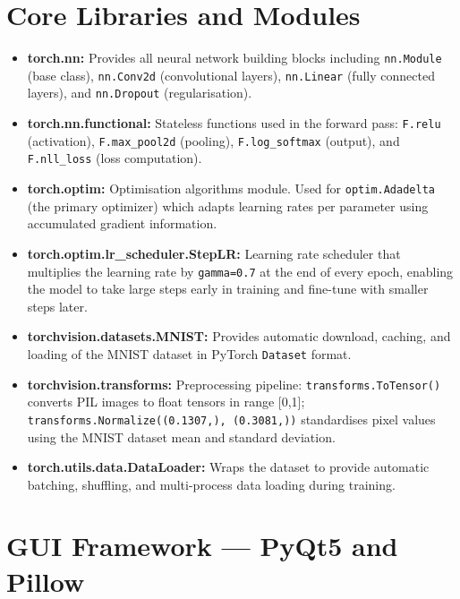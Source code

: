 \documentclass[12pt,a4paper,openany]{report}
\begin{document}
\section{Core Libraries and Modules}

\begin{itemize}
    \item \textbf{torch.nn:} Provides all neural network building blocks including \texttt{nn.Module} (base class), \texttt{nn.Conv2d} (convolutional layers), \texttt{nn.Linear} (fully connected layers), and \texttt{nn.Dropout} (regularisation).
    \item \textbf{torch.nn.functional:} Stateless functions used in the forward pass: \texttt{F.relu} (activation), \texttt{F.max\_pool2d} (pooling), \texttt{F.log\_softmax} (output), and \texttt{F.nll\_loss} (loss computation).
    \item \textbf{torch.optim:} Optimisation algorithms module. Used for \texttt{optim.Adadelta} (the primary optimizer) which adapts learning rates per parameter using accumulated gradient information.
    \item \textbf{torch.optim.lr\_scheduler.StepLR:} Learning rate scheduler that multiplies the learning rate by \texttt{gamma=0.7} at the end of every epoch, enabling the model to take large steps early in training and fine-tune with smaller steps later.
    \item \textbf{torchvision.datasets.MNIST:} Provides automatic download, caching, and loading of the MNIST dataset in PyTorch \texttt{Dataset} format.
    \item \textbf{torchvision.transforms:} Preprocessing pipeline: \texttt{transforms.ToTensor()} converts PIL images to float tensors in range [0,1]; \texttt{transforms.Normalize((0.1307,), (0.3081,))} standardises pixel values using the MNIST dataset mean and standard deviation.
    \item \textbf{torch.utils.data.DataLoader:} Wraps the dataset to provide automatic batching, shuffling, and multi-process data loading during training.
\end{itemize}

\section{GUI Framework --- PyQt5 and Pillow}
\end{document}
